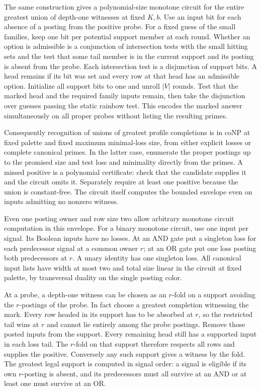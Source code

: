 The same construction gives a polynomial-size
monotone circuit for the entire greatest union of
depth-one witnesses at fixed $K,b$. Use an input
bit for each absence of a posting from the
positive probe. For a fixed guess of the small
families, keep one bit per potential support
member at each round. Whether an option is
admissible is a conjunction of intersection
tests with the small hitting sets and the test
that some tail member is in the current support
and its posting is absent from the probe.
Each intersection test is a disjunction of
support bits. A head remains if its bit was set
and every row at that head has an admissible
option. Initialize all support bits to one and
unroll $|V|$ rounds. Test that the marked head
and the required family inputs remain, then take
the disjunction over guesses passing the static
rainbow test. This encodes the marked answer
simultaneously on all proper probes without
listing the resulting primes.

Consequently recognition of unions of greatest
profile completions is in coNP at fixed palette
and fixed maximum minimal-loss size, from either
explicit losses or complete canonical primes.
In the latter case, enumerate the proper postings
up to the promised size and test loss and
minimality directly from the primes. A missed
positive is a polynomial certificate: check
that the candidate supplies it and the circuit
omits it. Separately require at least one
positive because the union is constant-free.
The circuit itself computes the bounded envelope
even on inputs admitting no nonzero witness.

Even one posting owner and row size two allow
arbitrary monotone circuit computation in this
envelope. For a binary monotone circuit, use one
input per signal. Its Boolean inputs have no losses.
At an AND gate put a singleton loss for each
predecessor signal at a common owner $r$; at an
OR gate put one loss posting both predecessors
at $r$. A unary identity has one singleton loss.
All canonical input lists have width at most
two and total size linear in the circuit at
fixed palette, by transversal duality on the
single posting color.

At a probe, a depth-one witness can be chosen
as an $r$-fold on a support avoiding the
$r$-postings of the probe. In fact choose a
greatest completion witnessing the mark. Every
row headed in its support has to be absorbed
at $r$, so the restricted tail wins at $r$
and cannot lie entirely among the probe
postings. Remove those posted inputs from
the support. Every remaining head still has
a supported input in each loss tail. The
$r$-fold on that support therefore respects
all rows and supplies the positive. Conversely
any such support gives a witness by the fold.
The greatest legal support is computed in
signal order: a signal is eligible if its own
$r$-posting is absent, and its predecessors
must all survive at an AND or at least one
must survive at an OR.

